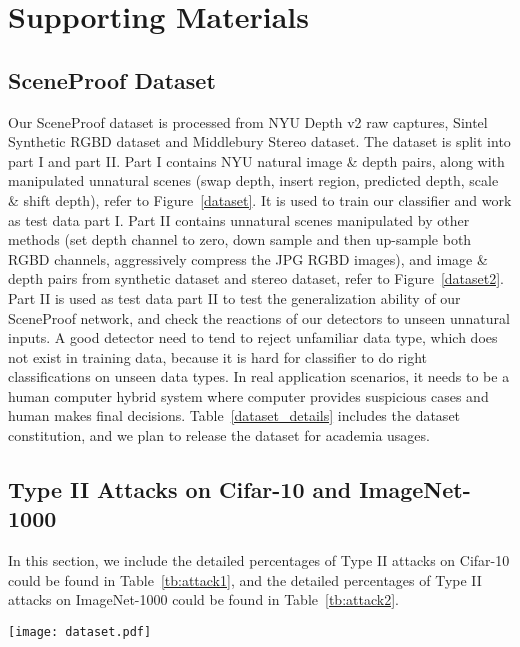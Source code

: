\documentclass[10pt,twocolumn,letterpaper]{article}
\begin{document}
\section{Supporting Materials}
\subsection{SceneProof Dataset}
Our SceneProof dataset is processed from NYU Depth v2 raw captures, Sintel Synthetic RGBD dataset and Middlebury Stereo dataset. 
The dataset is split into part I and part II. Part I contains NYU natural image \& depth pairs, along with manipulated unnatural scenes (swap depth,
insert region, predicted depth, scale \& shift depth), refer to Figure~\ref{dataset}. It is used to train our classifier and work as test data part I. 
Part II contains unnatural scenes manipulated by other methods (set depth channel to zero, down sample and then up-sample both RGBD channels, 
aggressively compress the JPG RGBD images), and image \& depth pairs from synthetic dataset and stereo dataset, refer to Figure~\ref{dataset2}. 
Part II is used as test data part II to test the generalization ability of our SceneProof network, and check the reactions of
our detectors to unseen unnatural inputs. A good detector need to tend to reject unfamiliar data type, which does not exist in training data, because
it is hard for classifier to do right classifications on unseen data types. In real application scenarios, it needs to be a human computer hybrid system
where computer provides suspicious cases and human makes final decisions. Table~\ref{dataset_details} includes the dataset constitution, and we plan
to release the dataset for academia usages. 

\subsection{Type II Attacks on Cifar-10 and ImageNet-1000}
In this section, we include the detailed percentages of Type II attacks on Cifar-10 could be found in Table~\ref{tb:attack1}, and 
the detailed percentages of Type II attacks on ImageNet-1000 could be found in Table~\ref{tb:attack2}. 

\begin{figure*}[h]
\begin{center}
\resizebox{0.9\textwidth}{!}
{
\texttt{[image: dataset.pdf]}
}
\caption{SceneProof dataset part I. Natural Scene has true label, and others have false labels. }
\label{dataset}
\end{center}
\vspace{-2ex}
\end{figure*}
\end{document}
